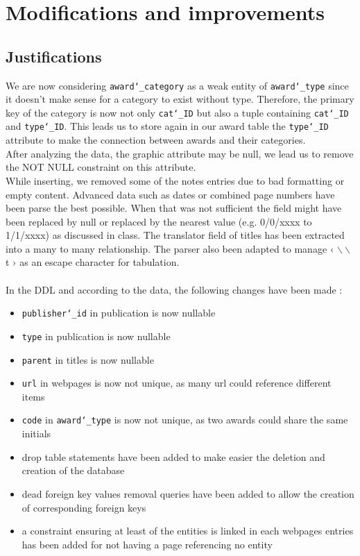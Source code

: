 \documentclass[doubleside, titlepage]{article}
\begin{document}
\setcounter{section}{0}

\section{Modifications and improvements}

\subsection{Justifications}
We are now considering \texttt{award\char`_category} as a weak entity of \texttt{award\char`_type} since it doesn’t make sense for a category to exist without type. Therefore, the primary key of the category is now not only \texttt{cat\char`_ID} but also a tuple containing \texttt{cat\char`_ID} and \texttt{type\char`_ID}. This leads us to store again in our award table the \texttt{type\char`_ID} attribute to make the connection between awards and their categories.
\\
After analyzing the data, the graphic attribute may be null, we lead us to remove the NOT NULL constraint on this attribute.
\\
While inserting, we removed some of the notes entries due to bad formatting or empty content. Advanced data such as dates or combined page numbers have been parse the best possible. When that was not sufficient the field might have been replaced by null or replaced by the nearest value (e.g. 0/0/xxxx to 1/1/xxxx) as discussed in class. The translator field of titles has been extracted into a many to many relationship. The parser also been adapted to manage ‹ $\backslash\backslash$t › as an escape character for tabulation.
~\\~\\
In the DDL and according to the data, the following changes have been made :
\begin{itemize}
	\item \texttt{publisher\char`_id} in publication is now nullable
	\item \texttt{type} in publication is now nullable
	\item \texttt{parent} in titles is now nullable
	\item \texttt{url} in webpages is now not unique, as many url could reference different items
	\item \texttt{code} in \texttt{award\char`_type} is now not unique, as two awards could share the same initials
	\item drop table statements have been added to make easier the deletion and creation of the database
	\item dead foreign key values removal queries have been added to allow the creation of corresponding foreign keys
	\item a constraint ensuring at least of the entities is linked in each webpages entries has been added for not having a page referencing no entity
\end{itemize}
\end{document}
